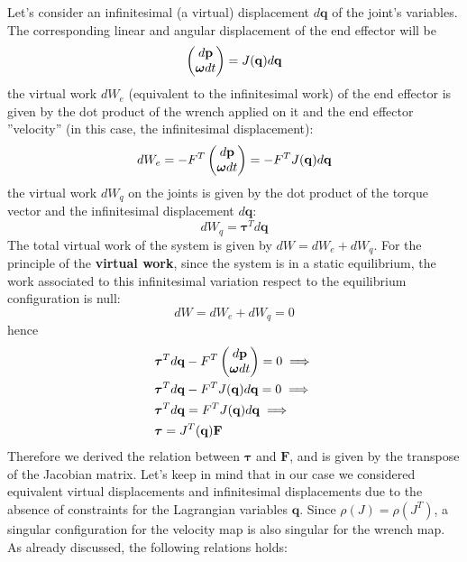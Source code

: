 \documentclass[10pt, letterpaper]{report}
\begin{document}
Let's consider an infinitesimal (a virtual) displacement $d\mathbf q$ of the joint's variables. The corresponding linear and angular displacement of the end effector will be\begin{equation}
    \begin{pmatrix}
        d\mathbf p\\ 
        {\boldsymbol{\omega}} dt 
    \end{pmatrix}=J(\mathbf q)d\mathbf q
\end{equation}
the virtual work $dW_e$ (equivalent to the infinitesimal work) of the end effector is given by the dot product of the wrench applied on it and the end effector ''velocity'' (in this case, the infinitesimal displacement):\begin{equation}
    dW_e=-F^T \begin{pmatrix}
        d\mathbf p\\ 
        {\boldsymbol{\omega}} dt 
    \end{pmatrix}=-F^TJ(\mathbf q)d\mathbf q
\end{equation}
the virtual work $dW_q$ on the joints is given by the dot product of the torque vector and the infinitesimal displacement $d\mathbf q$:\begin{equation}
    dW_q=\boldsymbol{\tau}^Td\mathbf q
\end{equation}
The total virtual work of the system is given by $dW=dW_e+dW_q$. For the principle of the \textbf{virtual work}, since the system is in a static equilibrium, the work associated to this infinitesimal variation respect to the equilibrium configuration is null:\begin{equation}
    dW=dW_e+dW_q = 0
\end{equation}
hence\begin{align}
    &\boldsymbol{\tau}^Td\mathbf q-F^T \begin{pmatrix}
        d\mathbf p\\ 
        {\boldsymbol{\omega}} dt 
    \end{pmatrix}=0\implies\\ 
    &\boldsymbol{\tau}^Td\mathbf q-F^TJ(\mathbf q)d\mathbf q=0\implies\\ 
    &\boldsymbol{\tau}^Td\mathbf q=F^TJ(\mathbf q)d\mathbf q\implies\\ 
    &\boldsymbol{\tau}=J^T(\mathbf q)\mathbf F 
\end{align}
Therefore we derived the relation between $\boldsymbol{\tau}$ and $\mathbf F $, and is given by the transpose of the Jacobian matrix. Let's keep in mind that in our case we considered equivalent virtual displacements and infinitesimal displacements due to the absence of constraints for the Lagrangian variables $\mathbf q$. Since $\rho(J)=\rho(J^T)$, a singular configuration for the velocity map is also singular for the wrench map. As already discussed, the following relations holds:
\end{document}
